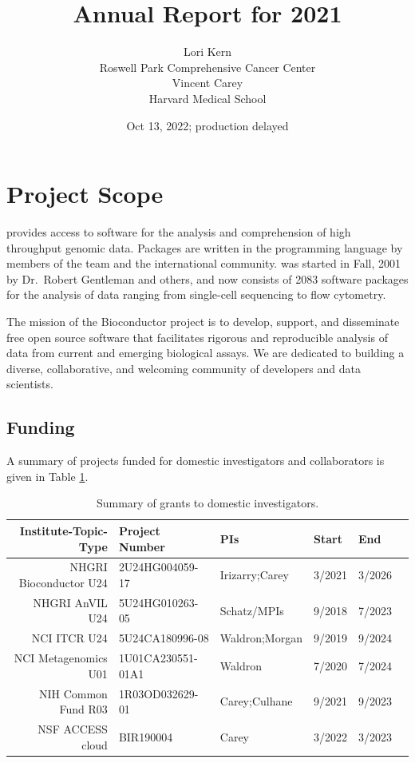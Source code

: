 \documentclass[letterpaper]{article}
\title{\Bioconductor{} Annual Report for 2021}
\author{Lori Kern\\ Roswell Park Comprehensive Cancer Center \\ Vincent Carey \\ Harvard Medical School}
\date{Oct 13, 2022; production delayed}
\begin{document}
\maketitle

\tableofcontents

\pagebreak

\section{Project Scope}

\Bioconductor{} provides access to software for the analysis and
comprehension of high throughput genomic data. Packages are written in
the \R{} programming language by members of the \Bioconductor{} team
and the international community. \Bioconductor{} was started in Fall,
2001 by Dr.\ Robert Gentleman and others, and now consists of 2083
software packages for the analysis of data ranging from single-cell
sequencing to flow cytometry.

The mission of the Bioconductor project is to develop, support, and disseminate
free open source software that facilitates rigorous and reproducible analysis of
data from current and emerging biological assays. We are dedicated to building a
diverse, collaborative, and welcoming community of developers and data
scientists.

\subsection{Funding}

A summary of projects funded for domestic investigators and 
collaborators is given in Table \ref{gra}.

\begin{table}[ht]
\centering
\begin{tabular}{rlllll}
  \hline
 Institute-Topic-Type & Project Number & PIs & Start & End \\ 
  \hline
 NHGRI Bioconductor U24 & 2U24HG004059-17 & Irizarry;Carey & 3/2021 & 3/2026 \\ 
 NHGRI AnVIL U24 & 5U24HG010263-05 & Schatz/MPIs & 9/2018 & 7/2023 \\ 
 NCI ITCR U24 & 5U24CA180996-08 & Waldron;Morgan & 9/2019 & 9/2024  \\ 
 NCI Metagenomics U01 & 1U01CA230551-01A1 & Waldron & 7/2020 & 7/2024 \\ 
 NIH Common Fund R03 & 1R03OD032629-01 & Carey;Culhane & 9/2021 & 9/2023 \\ 
 NSF ACCESS cloud & BIR190004 & Carey & 3/2022 & 3/2023 \\ 
   \hline
\end{tabular}
\caption{Summary of grants to domestic investigators.}
\label{gra}
\end{table}
\end{document}

